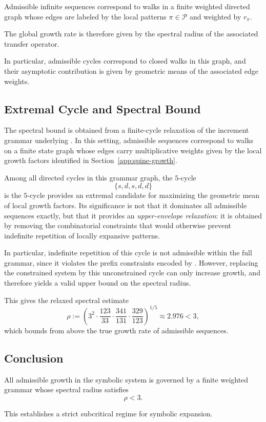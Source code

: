\documentclass[12pt, oneside]{article}
\numberwithin{equation}{section}
\theoremstyle{definition}
\theoremstyle{plain}
\theoremstyle{remark}
\begin{document}
Admissible infinite sequences correspond to walks in a finite weighted directed
graph whose edges are labeled by the local patterns $\pi \in \mathcal{P}$
and weighted by $r_\pi$.

The global growth rate is therefore given by the spectral radius of the
associated transfer operator.

In particular, admissible cycles correspond to closed walks in this graph,
and their asymptotic contribution is given by geometric means of the
associated edge weights.

\subsection{Extremal Cycle and Spectral Bound}
\label{subsec:extremal-cycle}

The spectral bound is obtained from a finite-cycle relaxation of the increment grammar
underlying . In this setting, admissible sequences correspond to
walks on a finite state graph whose edges carry multiplicative weights given by the
local growth factors identified in Section~\ref{app:spine-growth}.

Among all directed cycles in this grammar graph, the $5$-cycle
\[
\{ s, d, s, d, d \}
\]
is the $5$-cycle provides an extremal candidate for maximizing the geometric mean
of local growth factors. Its significance is not that it dominates all admissible
sequences exactly, but that it provides an \emph{upper-envelope relaxation}:
it is obtained by removing the combinatorial constraints that would otherwise
prevent indefinite repetition of locally expansive patterns.

In particular, indefinite repetition of this cycle is not admissible within the
full grammar, since it violates the prefix constraints encoded by
. However, replacing the constrained system by this unconstrained
cycle can only increase growth, and therefore yields a valid upper bound on the
spectral radius.

This gives the relaxed spectral estimate
\[
\rho :=
\left(
3^2 \cdot \frac{123}{33} \cdot \frac{341}{131} \cdot \frac{329}{123}
\right)^{1/5} \approx 2.976 < 3,
\]
which bounds from above the true growth rate of admissible sequences.

\subsection{Conclusion}

All admissible growth in the symbolic system is governed by a finite
weighted grammar whose spectral radius satisfies
\[
\rho < 3.
\]

This establishes a strict subcritical regime for symbolic expansion.

\clearpage


\end{document}
